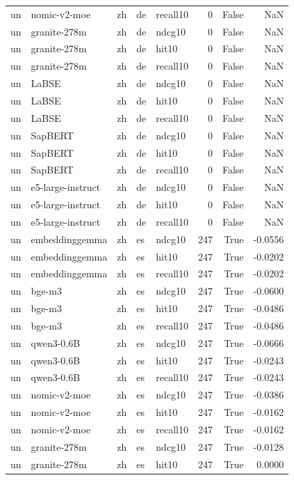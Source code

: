 \begin{tabular}{lllllrrr}
un & nomic-v2-moe & zh & de & recall10 & 0 & False & NaN \\
un & granite-278m & zh & de & ndcg10 & 0 & False & NaN \\
un & granite-278m & zh & de & hit10 & 0 & False & NaN \\
un & granite-278m & zh & de & recall10 & 0 & False & NaN \\
un & LaBSE & zh & de & ndcg10 & 0 & False & NaN \\
un & LaBSE & zh & de & hit10 & 0 & False & NaN \\
un & LaBSE & zh & de & recall10 & 0 & False & NaN \\
un & SapBERT & zh & de & ndcg10 & 0 & False & NaN \\
un & SapBERT & zh & de & hit10 & 0 & False & NaN \\
un & SapBERT & zh & de & recall10 & 0 & False & NaN \\
un & e5-large-instruct & zh & de & ndcg10 & 0 & False & NaN \\
un & e5-large-instruct & zh & de & hit10 & 0 & False & NaN \\
un & e5-large-instruct & zh & de & recall10 & 0 & False & NaN \\
un & embeddinggemma & zh & es & ndcg10 & 247 & True & -0.0556 \\
un & embeddinggemma & zh & es & hit10 & 247 & True & -0.0202 \\
un & embeddinggemma & zh & es & recall10 & 247 & True & -0.0202 \\
un & bge-m3 & zh & es & ndcg10 & 247 & True & -0.0600 \\
un & bge-m3 & zh & es & hit10 & 247 & True & -0.0486 \\
un & bge-m3 & zh & es & recall10 & 247 & True & -0.0486 \\
un & qwen3-0.6B & zh & es & ndcg10 & 247 & True & -0.0666 \\
un & qwen3-0.6B & zh & es & hit10 & 247 & True & -0.0243 \\
un & qwen3-0.6B & zh & es & recall10 & 247 & True & -0.0243 \\
un & nomic-v2-moe & zh & es & ndcg10 & 247 & True & -0.0386 \\
un & nomic-v2-moe & zh & es & hit10 & 247 & True & -0.0162 \\
un & nomic-v2-moe & zh & es & recall10 & 247 & True & -0.0162 \\
un & granite-278m & zh & es & ndcg10 & 247 & True & -0.0128 \\
un & granite-278m & zh & es & hit10 & 247 & True & 0.0000 \\

\end{tabular}
